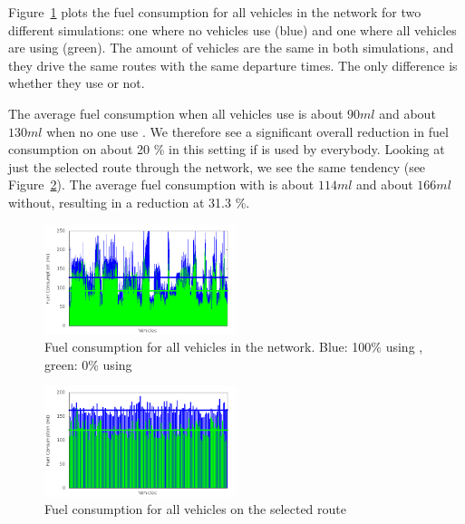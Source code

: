 Figure~\ref{fig:TestResults:fuelTotal} plots the fuel consumption for all vehicles in the network for two different simulations: one where no vehicles use \tech (blue) and one where all vehicles are using \tech (green).
The amount of vehicles are the same in both simulations, and they drive the same routes with the same departure times. 
The only difference is whether they use \tech or not.

The average fuel consumption when all vehicles use \tech is about $90 ml$ and about $130 ml$ when no one use \tech.
We therefore see a significant overall reduction in fuel consumption on about 20 \% in this setting if \tech is used by everybody.
Looking at just the selected route through the network, we see the same tendency (see Figure~\ref{fig:TestResults:fuelRoute}). 
The average fuel consumption with \tech is about $114 ml$ and about $166 ml$ without, resulting in a reduction at 31.3 \%.
\begin{figure}[h]
\includegraphics[width=0.5\textwidth]{../images/tp0c1_0/fuelTotal.png}
\caption{Fuel consumption for all vehicles in the network. Blue: 100\% using \tech, green: 0\% using \tech}
\label{fig:TestResults:fuelTotal}
\end{figure}
\begin{figure}[h]
\includegraphics[width=0.5\textwidth]{../images/tp0c1_0/fuelRoute.png}
\caption{Fuel consumption for all vehicles on the selected route}
\label{fig:TestResults:fuelRoute}
\end{figure}

